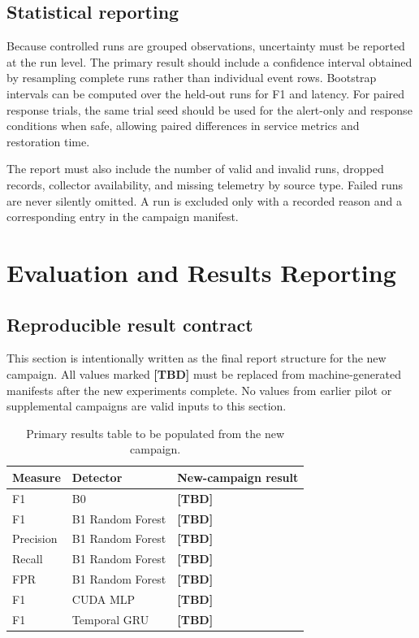 \documentclass[sigconf,review]{acmart}
\newcommand{\TBD}{\textbf{[TBD]}}
\newcommand{\RFPrecision}{\TBD}
\newcommand{\RFRecall}{\TBD}
\newcommand{\RFFOne}{\TBD}
\newcommand{\RFFPR}{\TBD}
\newcommand{\BZeroFone}{\TBD}
\newcommand{\MLPFOne}{\TBD}
\newcommand{\GRUFOne}{\TBD}
\begin{document}
\subsection{Statistical reporting}
Because controlled runs are grouped observations, uncertainty must be reported at the run level. The primary result should include a confidence interval obtained by resampling complete runs rather than individual event rows. Bootstrap intervals can be computed over the held-out runs for F1 and latency. For paired response trials, the same trial seed should be used for the alert-only and response conditions when safe, allowing paired differences in service metrics and restoration time.

The report must also include the number of valid and invalid runs, dropped records, collector availability, and missing telemetry by source type. Failed runs are never silently omitted. A run is excluded only with a recorded reason and a corresponding entry in the campaign manifest.

\section{Evaluation and Results Reporting}
\subsection{Reproducible result contract}
This section is intentionally written as the final report structure for the new campaign. All values marked \TBD{} must be replaced from machine-generated manifests after the new experiments complete. No values from earlier pilot or supplemental campaigns are valid inputs to this section.

\begin{table}[t]
\caption{Primary results table to be populated from the new campaign.}
\label{tab:primary}
\centering\scriptsize
\setlength{\tabcolsep}{3pt}
\renewcommand{\arraystretch}{1.08}
\begin{tabular}{lll}
\toprule
Measure & Detector & New-campaign result \\
\midrule
F1 & B0 & \BZeroFone \\
F1 & B1 Random Forest & \RFFOne \\
Precision & B1 Random Forest & \RFPrecision \\
Recall & B1 Random Forest & \RFRecall \\
FPR & B1 Random Forest & \RFFPR \\
F1 & CUDA MLP & \MLPFOne \\
F1 & Temporal GRU & \GRUFOne \\
\bottomrule
\end{tabular}
\end{table}
\end{document}
